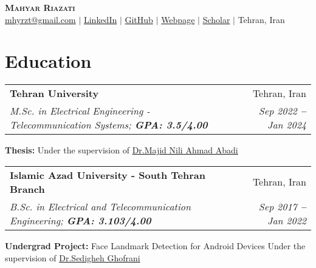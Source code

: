 \documentclass[letterpaper,11pt]{article}
\makeatletter
\newcommand{\resumeEducationHeading}[6]{
  \vspace{-2pt}\item
    \begin{tabular*}{0.97\textwidth}[t]{l@{\extracolsep{\fill}}r}
      \textbf{#1} & #2 \\
      \textit{\small#3} & \textit{\small #4} \\

    \end{tabular*}\vspace{-5pt}
}
\newcommand{\resumeSubHeadingListStart}{\begin{itemize}[leftmargin=0.15in, label={}]}
\newcommand{\resumeSubHeadingListEnd}{\end{itemize}}
\makeatother
\begin{document}
\begin{center}
    \textbf{\Huge \scshape Mahyar Riazati} \\ \vspace{8pt}
    \small
    \faEnvelope \hspace{.5pt} \href{mailto:mhyrzt@gmail.com}{mhyrzt@gmail.com}
    $|$
    \faLinkedinSquare \hspace{.5pt} \href{https://www.linkedin.com/in/mhyrzt}{LinkedIn}
    $|$
    \faGithub \hspace{.5pt} \href{https://github.com/mhyrzt}{GitHub}
    $|$
    \faGlobe \hspace{.5pt} \href{https://mhyrzt.me}{Webpage}
    $|$
    \faGraduationCap \hspace{.5pt} \href{https://scholar.google.com/citations?user=k-nwlcYAAAAJ&hl=en}{Scholar}
    $|$
    \faMapMarker \hspace{.5pt} Tehran, Iran
\end{center}


\section{Education}
\vspace{3pt}
\resumeSubHeadingListStart

\resumeEducationHeading
{Tehran University}{Tehran, Iran}
{M.Sc. in Electrical Engineering - Telecommunication Systems; \textbf{GPA: 3.5/4.00}}{Sep 2022 \textbf{--} Jan 2024}
{} {}
\resumeSubHeadingListStart
\small{\item{\textbf{Thesis:} Under the supervision of \href{https://ece.ut.ac.ir/en/~mnili}{\color{blue}Dr.Majid Nili Ahmad Abadi}}}
\resumeSubHeadingListEnd

\resumeEducationHeading
{Islamic Azad University - South Tehran Branch}{Tehran, Iran}
{B.Sc. in Electrical and Telecommunication Engineering; \textbf{GPA: 3.103/4.00}}{Sep 2017 \textbf{--} Jan 2022}
{} {}
\resumeSubHeadingListStart
\small{\item{\textbf{Undergrad Project:} Face Landmark Detection for Android Devices Under the supervision of  \href{https://www.linkedin.com/in/sedigheh-ghofrani-b6495b63/}{\color{blue}Dr.Sedigheh Ghofrani}}}
\resumeSubHeadingListEnd

\resumeSubHeadingListEnd

\end{document}
